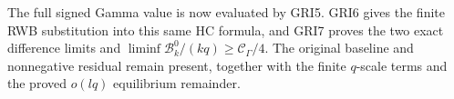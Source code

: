 The full signed Gamma value is now evaluated by GRI5.
GRI6 gives the finite RWB substitution into this same HC
formula, and GRI7 proves the two exact difference limits
and $\liminf\mathcal B_k^0/(kq)\geq\mathcal C_\Gamma/4$.
The original baseline and nonnegative residual remain
present, together with the finite $q$-scale terms and
the proved $o(lq)$ equilibrium remainder.